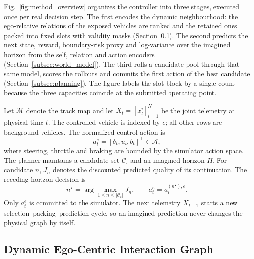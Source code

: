 \documentclass[journal]{IEEEtran}
\begin{document}
Fig.~\ref{fig:method_overview} organizes the controller into three stages,
executed once per real decision step. The first encodes the dynamic
neighbourhood: the ego-relative relations of the exposed vehicles are ranked and
the retained ones packed into fixed slots with validity masks
(Section~\ref{subsec:graph_world_model}). The second predicts the next state,
reward, boundary-risk proxy and log-variance over the imagined horizon from the
self, relation and action encoders (Section~\ref{subsec:world_model}). The third
rolls a candidate pool through that same model, scores the rollouts and commits
the first action of the best candidate (Section~\ref{subsec:planning}). The
figure labels the slot block by a single count because the three capacities
coincide at the submitted operating point.

Let $\mathcal M$ denote the track map and let
$X_t=[x_t^i]_{i=1}^{N}$ be the joint telemetry at physical time $t$. The
controlled vehicle is indexed by $e$; all other rows are background vehicles.
The normalized control action is
\begin{equation}
 a_t^e=[\delta_t,u_t,b_t]^\top\in\mathcal A,
\end{equation}
where steering, throttle and braking are bounded by the simulator action
space. The planner maintains a candidate set $\mathcal C_t$ and an imagined
horizon $H$. For candidate $n$, $J_n$ denotes the discounted predicted
quality of its continuation. The receding-horizon decision is
\begin{equation}
 n^\star=\arg\max_{1\le n\le|\mathcal C_t|}J_n,\qquad
 a_t^e= a_t^{(n^\star),e}.
\label{eq:main_action_selection}
\end{equation}
Only $a_t^e$ is committed to the simulator. The next telemetry $X_{t+1}$
starts a new selection--packing--prediction cycle, so an imagined prediction
never changes the physical graph by itself.

\subsection{Dynamic Ego-Centric Interaction Graph}
\label{subsec:graph_world_model}
\end{document}

